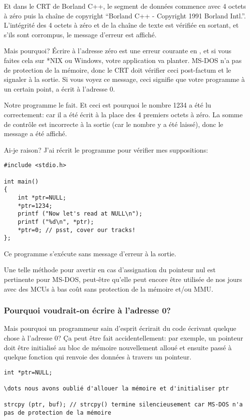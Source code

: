 Et dans le \ac{CRT} de Borland C++, le segment de données commence avec 4 octets
à zéro puis la chaîne de copyright ``Borland C++ - Copyright 1991 Borland Intl.''.
L'intégrité des 4 octets à zéro et de la chaîne de texte est vérifiée en sortant,
et s'ils sont corrompus, le message d'erreur est affiché.

Mais pourquoi? Écrire à l'adresse zéro est une erreur courante en \CCpp, et si vous
faites cela sur *NIX ou Windows, votre application va planter.
MS-DOS n'a pas de protection de la mémoire, donc le \ac{CRT} doit vérifier ceci post-factum
et le signaler à la sortie.
Si vous voyez ce message, ceci signifie que votre programme à un certain point, a
écrit à l'adresse 0.

Notre programme le fait. Et ceci est pourquoi le nombre 1234 a été lu correctement:
car il a été écrit à la place des 4 premiers octets à zéro.
La somme de contrôle est incorrecte à la sortie (car le nombre y a été laissé), donc
le message a été affiché.

Ai-je raison?
J'ai récrit le programme pour vérifier mes suppositions:

\begin{lstlisting}[style=customc]
#include <stdio.h>

int main()
{
	int *ptr=NULL;
	*ptr=1234;
	printf ("Now let's read at NULL\n");
	printf ("%d\n", *ptr);
	*ptr=0; // psst, cover our tracks!
};
\end{lstlisting}

Ce programme s'exécute sans message d'erreur à la sortie.

Une telle méthode pour avertir en cas d'assignation du pointeur nul est pertinente
pour MS-DOS, peut-être qu'elle peut encore être utilisée de nos jours avec des \ac{MCU}s
à bas coût sans protection de la mémoire et/ou \ac{MMU}.

\subsubsection{Pourquoi voudrait-on écrire à l'adresse 0?}

Mais pourquoi un programmeur sain d'esprit écrirait du code écrivant quelque chose
à l'adresse 0?
Ça peut être fait accidentellement: par exemple, un pointeur doit être initialisé
au bloc de mémoire nouvellement alloué et ensuite passé à quelque fonction qui renvoie
des données à travers un pointeur.

\begin{lstlisting}[style=customc]
int *ptr=NULL;

\dots nous avons oublié d'allouer la mémoire et d'initialiser ptr

strcpy (ptr, buf); // strcpy() termine silencieusement car MS-DOS n'a pas de protection de la mémoire
\end{lstlisting}

